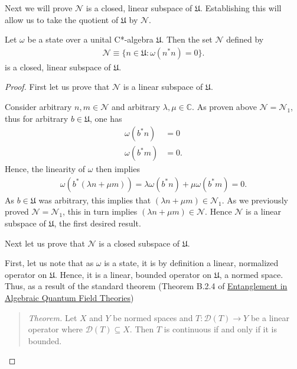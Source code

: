 Next we will prove $\mathcal{N}$ is a closed, linear subspace of $\mathfrak{U}$. Establishing this will allow us to take the quotient of $\mathfrak{U}$ by $\mathcal{N}$.

\begin{lemma}
    \label{lmm:lmm2}
    \leanok
    Let $\omega$ be a state over a unital C*-algebra $\mathfrak{U}$. Then the set $\mathcal{N}$ defined by
    \begin{align}
        \mathcal{N} \equiv \{ n \in \mathfrak{U} : \omega(n^*n) = 0 \}.
    \end{align}
    is a closed, linear subspace of $\mathfrak{U}$.
\end{lemma}
\begin{proof}
First let us prove that $\mathcal{N}$ is a linear subspace of $\mathfrak{U}$.

Consider arbitrary $n,m \in \mathcal{N}$ and arbitrary $\lambda, \mu \in \mathbb{C}$. As proven above $\mathcal{N} = \mathcal{N}_1$, thus for arbitrary $b \in \mathfrak{U}$, one has
\begin{align}
    \omega(b^*n) &= 0 \\
    \omega(b^*m) &= 0.
\end{align}
Hence, the linearity of $\omega$ then implies
\begin{align}
    \omega(b^*(\lambda n + \mu m)) = \lambda \omega(b^*n) + \mu \omega(b^*m) = 0.
\end{align}
As $b \in \mathfrak{U}$ was arbitrary, this implies that $(\lambda n + \mu m) \in \mathcal{N}_1$. As we previously proved $\mathcal{N} = \mathcal{N}_1$, this in turn implies $(\lambda n + \mu m) \in \mathcal{N}$. Hence $\mathcal{N}$ is a linear subspace of $\mathfrak{U}$, the first desired result.

Next let us prove that $\mathcal{N}$ is a closed subspace of $\mathfrak{U}$.

First, let us note that as $\omega$ is a state, it is by definition a linear, normalized operator on $\mathfrak{U}$. Hence, it is a linear, bounded operator on $\mathfrak{U}$, a normed space. Thus, as a result of the standard theorem (Theorem B.2.4 of \href{https://arxiv.org/abs/2410.16599}{Entanglement in Algebraic Quantum Field Theories})

\begin{quote}
    \textit{Theorem.} Let $X$ and $Y$ be normed spaces and $T: \mathcal{D}(T) \rightarrow Y$ be a linear operator where $\mathcal{D}(T) \subseteq X$. Then $T$ is continuous if and only if it is bounded.
\end{quote}


\end{proof}
